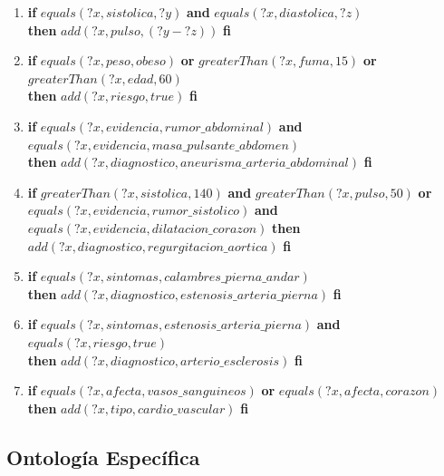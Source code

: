 \documentclass[10pt, a4paper,spanish]{article}
\begin{document}
			\begin{enumerate}[label={\textbf{R\theenumi:}}]

				\item
					\textbf{if} $equals(?x, sistolica, ?y)$ \textbf{and} $equals(?x, diastolica, ?z)$ \\
					\textbf{then} $add(?x, pulso, (?y - ?z) )$ \textbf{fi}

				\item
					\textbf{if} $equals(?x, peso, obeso)$ \textbf{or} $greaterThan(?x, fuma, 15)$ \textbf{or} $greaterThan(?x, edad, 60)$ \\
					\textbf{then} $add(?x, riesgo, true)$ \textbf{fi}

				\item
					\textbf{if} $equals(?x, evidencia, rumor\_abdominal)$ \textbf{and} $equals(?x, evidencia, masa\_pulsante\_abdomen)$ \\
					\textbf{then} $add(?x, diagnostico, aneurisma\_arteria\_abdominal)$ \textbf{fi}

				\item
					\textbf{if} $greaterThan(?x, sistolica, 140)$ \textbf{and} $greaterThan(?x, pulso, 50)$ \textbf{or} \\
					\hspace*{0.5cm} $equals(?x, evidencia, rumor\_sistolico)$ \textbf{and} $equals(?x, evidencia, dilatacion\_corazon)$
					\textbf{then} $add(?x, diagnostico, regurgitacion\_aortica)$ \textbf{fi}

				\item
					\textbf{if} $equals(?x, sintomas, calambres\_pierna\_andar)$ \\
					\textbf{then} $add(?x, diagnostico, estenosis\_arteria\_pierna)$ \textbf{fi}

				\item
					\textbf{if} $equals(?x, sintomas, estenosis\_arteria\_pierna)$ \textbf{and} $equals(?x, riesgo, true)$ \\
					\textbf{then} $add(?x, diagnostico, arterio\_esclerosis)$ \textbf{fi}

				\item
					\textbf{if} $equals(?x, afecta, vasos\_sanguineos)$ \textbf{or} $equals(?x, afecta, corazon)$ \\
					\textbf{then} $add(?x, tipo, cardio\_vascular)$ \textbf{fi}

			\end{enumerate}

		\subsection{Ontología Específica}
\end{document}
